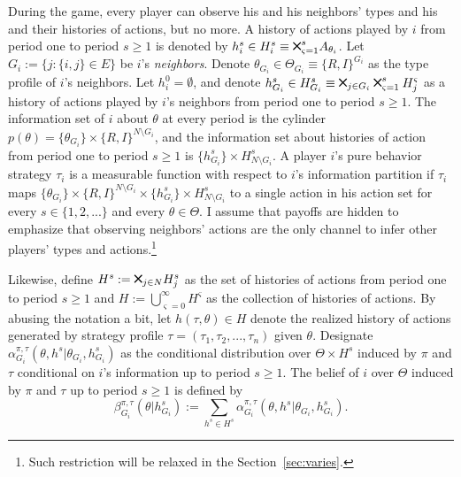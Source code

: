 \documentclass[12pt,letter]{article}
\theoremstyle{definition}
\theoremstyle{remark}
\theoremstyle{claim}
\newcommand{\bigtimes}{\mathbin{\tikz [x=1.4ex,y=1.4ex,line width=.2ex] \draw (0,0) -- (1,1) (0,1) -- (1,0);}}%
\begin{document}
During the game, every player can observe his and his neighbors' types and his and their histories of actions, but no more. A history of actions played by $i$ from period one to period $s\geq 1$ is denoted by $h^s_i\in H^s_{i}\equiv\bigtimes^s_{\varsigma =1} A_{\theta_i}$. Let $G_i:= \{j:\{i,j\}\in E\}$ be $i$'s \textit{neighbors}. Denote $\theta_{G_i}\in \Theta_{G_i}\equiv \{R,I\}^{G_i}$ as the type profile of $i$'s neighbors. Let $h^0_i=\emptyset$, and denote $h^s_{G_i}\in H^s_{G_i}\equiv\bigtimes_{j\in G_i}\bigtimes^s_{\varsigma =1}H^{\varsigma}_j$ as a history of actions played by $i$'s neighbors from period one to period $s\geq 1$. The information set of $i$ about $\theta$ at every period is the cylinder $p(\theta)=\{\theta_{G_i}\}\times \{R,I\}^{N\setminus G_i}$, and the information set about histories of action from period one to period $s\geq 1$ is $\{h^s_{G_i}\}\times H^s_{N\setminus G_i}$. A player $i$'s pure behavior strategy $\tau_{i}$ is a measurable function with respect to $i$'s information partition if $\tau_i$ maps $\{\theta_{G_i}\}\times \{R,I\}^{N\setminus G_i}\times \{h^s_{G_i}\}\times H^s_{N\setminus G_i}$ to a single action in his action set for every $s\in\{1,2,...\}$ and every $\theta\in \Theta$. I assume that payoffs are hidden to emphasize that observing neighbors' actions are the only channel to infer other players' types and actions.\footnote{Such restriction will be relaxed in the Section~\ref{sec:varies}.} 

Likewise, define $H^s:=\bigtimes_{j\in N} H^s_{j}$ as the set of histories of actions from period one to period $s\geq 1$ and $H:= \bigcup^{\infty}_{\varsigma=0} H^{\varsigma}$ as the collection of histories of actions. By abusing the notation a bit, let $h({\tau},\theta)\in H$ denote the realized history of actions generated by strategy profile $\tau=(\tau_1,\tau_2,...,\tau_n)$ given $\theta$. Designate $\alpha^{\pi,\tau}_{G_i}(\theta, h^{s}|\theta_{G_i},h^{s}_{G_i})$ as the conditional distribution over $\Theta\times H^s$ induced by $\pi$ and $\tau$ conditional on $i$'s information up to period $s\geq 1$. The belief of $i$ over $\Theta$ induced by $\pi$ and $\tau$ up to period $s\geq 1$ is defined by 
\[\beta^{\pi,\tau}_{G_i}(\theta|h^{s}_{G_i}):= \sum_{h^{s}\in H^s}\alpha^{\pi,\tau}_{G_i}(\theta, h^{s}|\theta_{G_i},h^{s}_{G_i}).\]
\end{document}

